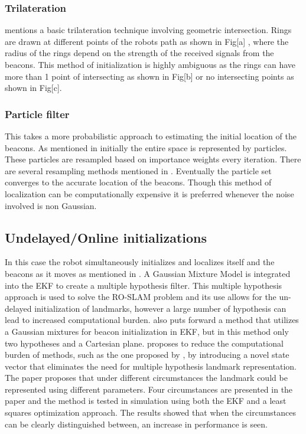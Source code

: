 \documentclass[conference]{IEEEtran}
\begin{document}
\subsubsection{Trilateration}
\cite{Thrun2002} mentions a basic trilateration technique involving geometric intersection. Rings are drawn at different points of the robots path as shown in Fig[a] , where the radius of the rings depend on the strength of the received signals from the beacons. This method of initialization is highly ambiguous as the rings can have more than 1 point of intersecting as shown in Fig[b]  or no  intersecting points as shown in Fig[c]. %
\subsubsection{Particle filter}
This takes a more probabilistic approach to estimating the initial location of the beacons. As mentioned in\cite{Thrun2002a} initially the entire space is represented by particles. These particles are resampled based on importance weights every iteration. There are several resampling methods mentioned in \cite{Li2015}. Eventually the particle set converges to the accurate location of the beacons. Though this method of localization can be computationally expensive it is preferred whenever the noise involved is non Gaussian.

\subsection{Undelayed/Online initializations}
In this case the robot simultaneously initializes and localizes itself and the beacons as it moves
as mentioned in \cite{Caballero2010}. A Gaussian Mixture Model is integrated into the EKF to create a multiple hypothesis filter.  This multiple hypothesis approach is used to solve the RO-SLAM problem and its use allows for the un-delayed initialization of landmarks, however a large number of hypothesis can lead to increased computational burden. \cite{Geneve2015} also puts forward a method that utilizes a Gaussian mixtures for beacon initialization in EKF, but in this method only two hypotheses and a Cartesian plane. \cite{Ahmad2011a} proposes to reduce the computational burden of methods, such as the one proposed by \cite{Caballero2010}, by introducing a novel state vector that eliminates the need for multiple hypothesis landmark representation. The paper proposes that under different circumstances the landmark could be represented using different parameters. Four circumstances are presented in the paper and the method is tested in simulation using both the EKF and a least squares optimization approach. The results showed that when the circumstances can be clearly distinguished between, an increase in performance is seen.
\end{document}
